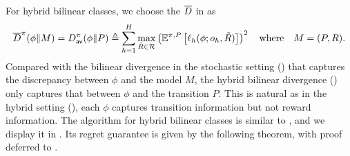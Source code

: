 For hybrid bilinear classes, we choose the $\overline{D}$ in  as 
\begin{align}
    \overline{D}^\pi(\phi\| M)=D^\pi_{\mathsf{av}}(\phi\|P) \triangleq \sum_{h=1}^H\max_{\tilde{R}\in\mathcal{R}}\left(\mathbb{E}^{\pi, P}\left[\ell_h(\phi; o_h, \tilde{R})\right]\right)^2 \quad \text{where} \quad M = (P,R). 
    \label{eq:h-bi-div}
\end{align}
Compared with the bilinear divergence in the stochastic setting () that captures the discrepancy between $\phi$ and the model $M$, the hybrid bilinear divergence () only captures that between $\phi$ and the transition $P$. This is natural as in the hybrid setting (), each $\phi$ captures transition information but not reward information.  %
The algorithm for hybrid bilinear classes is similar to , and we display it in . Its regret guarantee is given by the following theorem, with proof deferred to .  

